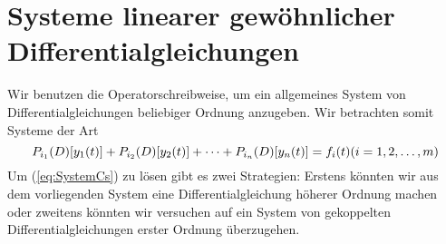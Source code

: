 \chapter{Systeme linearer gewöhnlicher Differentialgleichungen}
Wir benutzen die Operatorschreibweise, um ein allgemeines System von
Differentialgleichungen beliebiger Ordnung anzugeben. Wir betrachten somit
Systeme der Art
\begin{equation}
  P_{i_1}(D)[y_1(t)]+P_{i_2}(D)[y_2(t)]+\dots+P_{i_n}(D)[y_n(t)]=f_i(t)\hfill
  (i=1,2,\dots,m)
  \label{eq:SystemGeneral}
\end{equation}
Um (\ref{eq:SystemCs}) zu lösen gibt es zwei Strategien: Erstens könnten wir
aus dem vorliegenden System eine Differentialgleichung höherer Ordnung machen
oder zweitens könnten wir versuchen auf ein System von gekoppelten
Differentialgleichungen erster Ordnung überzugehen.

